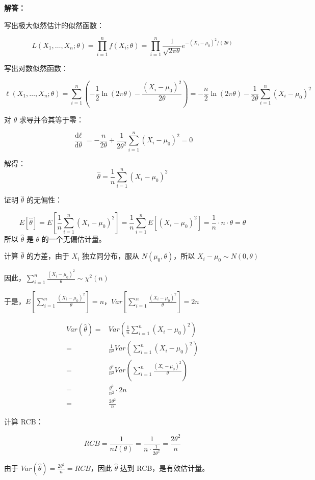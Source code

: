 \documentclass[12pt,a4paper]{article}
\begin{document}
\begin{answerbox}
\textbf{解答：}

写出极大似然估计的似然函数：

$$
L(X_1, \ldots, X_n; \theta) = \prod_{i=1}^n f(X_i; \theta) = \prod_{i=1}^n \frac{1}{\sqrt{2\pi \theta}} e^{-(X_i-\mu_0)^2/(2\theta)}
$$

写出对数似然函数：

$$
\ell(X_1, \ldots, X_n; \theta) = \sum_{i=1}^n \left( -\frac{1}{2} \ln (2\pi \theta) - \frac{(X_i-\mu_0)^2}{2\theta} \right) = -\frac{n}{2} \ln (2\pi \theta) - \frac{1}{2\theta} \sum_{i=1}^n (X_i-\mu_0)^2
$$

对 $\theta$ 求导并令其等于零：

$$
\frac{\text{d} \ell}{\text{d} \theta} = -\frac{n}{2\theta} + \frac{1}{2\theta^2} \sum_{i=1}^n (X_i-\mu_0)^2 = 0
$$

解得：
$$
\hat{\theta} = \frac{1}{n} \sum_{i=1}^n (X_i-\mu_0)^2
$$

证明 $\hat{\theta}$ 的无偏性：

$$
E[\hat{\theta}] = E\left[\frac{1}{n} \sum_{i=1}^n (X_i-\mu_0)^2\right] = \frac{1}{n} \sum_{i=1}^n E[(X_i-\mu_0)^2] = \frac{1}{n} \cdot n \cdot \theta = \theta
$$
所以 $\hat{\theta}$ 是 $\theta$ 的一个无偏估计量。

计算 $\hat{\theta}$ 的方差，由于 $X_i$ 独立同分布，服从 $N(\mu_0, \theta)$，所以 $X_i - \mu_0 \sim N(0, \theta)$

因此，$\sum_{i=1}^n \frac{(X_i-\mu_0)^2}{\theta} \sim \chi^2(n)$

于是，$E\left[\sum_{i=1}^n \frac{(X_i-\mu_0)^2}{\theta}\right] = n$，$Var\left[\sum_{i=1}^n \frac{(X_i-\mu_0)^2}{\theta}\right] = 2n$

$$
\begin{aligned}
Var(\hat{\theta}) =& Var\left(\frac{1}{n} \sum_{i=1}^n (X_i-\mu_0)^2\right) \\
=& \frac{1}{n^2} Var\left(\sum_{i=1}^n (X_i-\mu_0)^2\right) \\
=& \frac{\theta^2}{n^2} Var\left(\sum_{i=1}^n  \frac{(X_i-\mu_0)^2}{\theta}\right) \\
=& \frac{\theta^2}{n^2} \cdot 2n \\
=& \frac{2\theta^2}{n}
\end{aligned}
$$

计算 RCB：

$$
RCB = \frac{1}{nI(\theta)} = \frac{1}{n \cdot \frac{1}{2\theta^2}} = \frac{2\theta^2}{n}
$$

由于 $Var(\hat{\theta}) = \frac{2\theta^2}{n} = RCB$，因此 $\hat{\theta}$ 达到 RCB，是有效估计量。


\end{answerbox}
\end{document}
